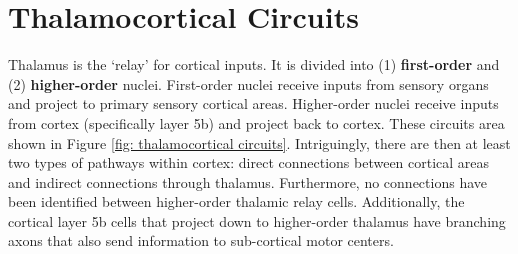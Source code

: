 \section{Thalamocortical Circuits}

Thalamus is the `relay' for cortical inputs. It is divided into (1) \textbf{first-order} and (2) \textbf{higher-order} nuclei. First-order nuclei receive inputs from sensory organs and project to primary sensory cortical areas. Higher-order nuclei receive inputs from cortex (specifically layer 5b) and project back to cortex. These circuits area shown in Figure \ref{fig: thalamocortical circuits}. Intriguingly, there are then at least two types of pathways within cortex: direct connections between cortical areas and indirect connections through thalamus. Furthermore, no connections have been identified between higher-order thalamic relay cells. Additionally, the cortical layer 5b cells that project down to higher-order thalamus have branching axons that also send information to sub-cortical motor centers.

